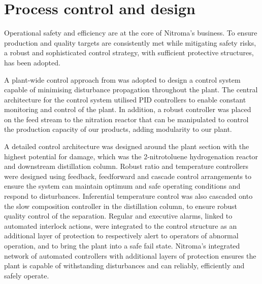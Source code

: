 \section*{Process control and design}

Operational safety and efficiency are at the core of Nitroma's business. To ensure production and quality targets are consistently met while mitigating safety risks, a robust and sophisticated control strategy, with sufficient protective structures, has been adopted.

A plant-wide control approach from \textcite{luyben_plantwide_1997} was adopted to design a control system capable of minimising disturbance propagation throughout the plant. The central architecture for the control system utilised PID controllers to enable constant monitoring and control of the plant. In addition, a robust controller was placed on the feed stream to the nitration reactor that can be manipulated to control the production capacity of our products, adding modularity to our plant.      


A detailed control architecture was designed around the plant section with the highest potential for damage, which was the 2-nitrotoluene hydrogenation reactor and downstream distillation column. Robust ratio and temperature controllers were designed using feedback, feedforward and cascade control arrangements to ensure the system can maintain optimum and safe operating conditions and respond to disturbances. Inferential temperature control was also cascaded onto the slow composition controller in the distillation column, to ensure robust quality control of the separation. Regular and executive alarms, linked to automated interlock actions, were integrated to the control structure as an additional layer of protection to respectively alert to operators of abnormal operation, and to bring the plant into a safe fail state. Nitroma's integrated network of automated controllers with additional layers of protection ensures the plant is capable of withstanding disturbances and can reliably, efficiently and safely operate. 



